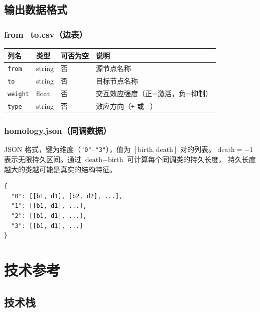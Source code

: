 \documentclass[12pt,a4paper]{ctexart}
\newcommand{\param}[1]{\texttt{#1}}
\begin{document}
\subsection{输出数据格式}

\subsubsection{from\_to.csv（边表）}

\begin{center}
\small
\begin{tabular}{@{}lllp{5.5cm}@{}}
\toprule
\textbf{列名} & \textbf{类型} & \textbf{可否为空} & \textbf{说明} \\
\midrule
\param{from}   & string & 否 & 源节点名称 \\
\param{to}     & string & 否 & 目标节点名称 \\
\param{weight} & float  & 否 & 交互效应强度（正=激活，负=抑制）\\
\param{type}   & string & 否 & 效应方向（\texttt{+} 或 \texttt{-}）\\
\bottomrule
\end{tabular}
\end{center}

\subsubsection{homology.json（同调数据）}

JSON 格式，键为维度（\texttt{"0"}--\texttt{"3"}），值为 $[\text{birth}, \text{death}]$ 对的列表。
$\text{death} = -1$ 表示无限持久区间。通过 $\text{death} - \text{birth}$ 可计算每个同调类的持久长度，
持久长度越大的类越可能是真实的结构特征。

\begin{verbatim}
{
  "0": [[b1, d1], [b2, d2], ...],
  "1": [[b1, d1], ...],
  "2": [[b1, d1], ...],
  "3": [[b1, d1], ...]
}
\end{verbatim}

\section{技术参考}

\subsection{技术栈}
\end{document}
